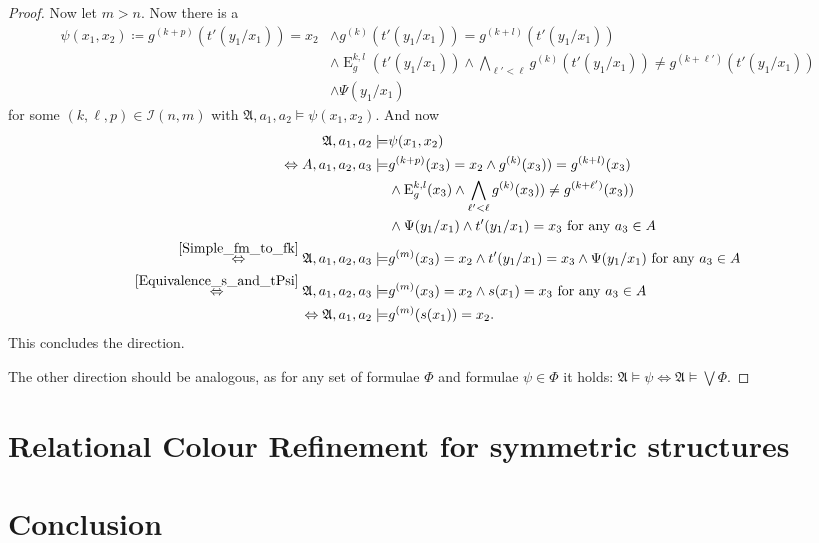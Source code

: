 \documentclass[a4paper,11pt,DIV=15]{scrartcl} %
\theoremstyle{plain}
\theoremstyle{definition}
\begin{document}
\begin{proof}
	Now let $m>n$.
	Now there is a 
	\begin{align*}
		\psi(x_1,x_2)\coloneqq g^{(k+p)}(t'(y_1/x_1))=x_2 &\land g^{(k)}(t'(y_1/x_1))=g^{(k+l)}(t'(y_1/x_1)) \\
		& \land \operatorname{E}^{k,l}_g(t'(y_1/x_1)) \land \bigwedge_{\ell'<\ell} g^{(k)}(t'(y_1/x_1))\neq g^{(k+\ell')}(t'(y_1/x_1)) \\
		& \land \Psi(y_1/x_1)
	\end{align*}
	for some $(k,\ell,p)\in\mathcal I(n,m)$ with $\mathfrak A,a_1,a_2\models \psi(x_1,x_2)$.
	And now
	\begin{align*}
		\mathfrak A,a_1,a_2 \models & \psi(x_1,x_2) \\
		\Leftrightarrow A,a_1,a_2,a_3 \models &g^{(k+p)}(x_3)=x_2 \land g^{(k)}(x_3))=g^{(k+l)}(x_3) \\
			& \land \operatorname{E}^{k,l}_g(x_3) \land \bigwedge_{\ell'<\ell} g^{(k)}(x_3))\neq g^{(k+\ell')}(x_3)) \\
			& \land \Psi(y_1/x_1) \land t'(y_1/x_1)=x_3 \text{ for any } a_3\in A \\
		\overset{\cref{Simple_fm_to_fk}}{\Leftrightarrow} \mathfrak A, a_1,a_2,a_3 \models & g^{(m)}(x_3)=x_2 \land t'(y_1/x_1)=x_3 \land \Psi(y_1/x_1) \text{ for any } a_3 \in A \\
		\overset{\cref{Equivalence_s_and_tPsi}}{\Leftrightarrow} \mathfrak A,a_1,a_2,a_3 \models & g^{(m)}(x_3)=x_2\land s(x_1)=x_3 \text{ for any } a_3\in A \\
		\Leftrightarrow \mathfrak A,a_1,a_2 \models & g^{(m)}(s(x_1))=x_2.
	\end{align*}
	This concludes the direction.
	
	The other direction should be analogous, as for any set of formulae $\Phi$ and formulae $\psi\in \Phi$ it holds: $\mathfrak A \models \psi \Leftrightarrow \mathfrak A\models \bigvee \Phi$.
\end{proof}

\section {Relational Colour Refinement for symmetric structures}

\lipsum[3-4]

\section{Conclusion}

\lipsum[2-3]


\clearpage



\end{document}
